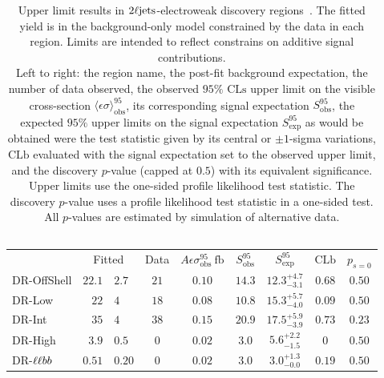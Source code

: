 \FloatBarrier
\begin{table}[tp]
\centering
\begin{tabular*}{\textwidth}{lr@{$~\pm~$}lcccccc}
& \multicolumn{2}{c}{Fitted}
& Data
& $A\epsilon\sigma_{\mathrm{obs}}^{95}~\mathrm{fb}$
& $S_{\mathrm{obs}}^{95}$
& $S_{\mathrm{exp}}^{95}$
& $\mathrm{CLb}$
& $p_{s\!=\!0}$
\\[1.5ex]
DR-OffShell & $22.1$ & $2.7$ & $21$ & $0.10$ & $14.3$ & $12.3^{+4.7}_{-3.1}$ & $0.68$ & $0.50$
\\[.5ex]
DR-Low & $22$ & $4$ & $18$ & $0.08$ & $10.8$ & $15.3^{+5.7}_{-4.0}$ & $0.09$ & $0.50$
\\[.5ex]
DR-Int & $35$ & $4$ & $38$ & $0.15$ & $20.9$ & $17.5^{+5.9}_{-3.9}$ & $0.73$ & $0.23$
\\[.5ex]
DR-High & $3.9$ & $0.5$ & $0$ & $0.02$ & $3.0$ & $5.6^{+2.2}_{-1.5}$ & $0$ & $0.50$
\\[.5ex]
DR-$\ell\ell bb$ & $0.51$ & $0.20$ & $0$ & $0.02$ & $3.0$ & $3.0^{+1.3}_{-0.0}$ & $0.19$ & $0.50$
\\[.5ex]
\end{tabular*}
\caption[
Upper limit results in $\twoljets$-electroweak discovery regions
]{%
Upper limit results in $\twoljets$-electroweak discovery
regions~\cite{atlas2022searches}.
The fitted yield is in the background-only model constrained by the data in each region.
Limits are intended to reflect constrains on additive signal contributions.
\\[0.5em]
Left to right:
the region name,
the post-fit background expectation,
the number of data observed,
the observed $95\%$ $\mathrm{CLs}$ upper limit on the visible cross-section
$\langle\epsilon\sigma\rangle_\mathrm{obs}^{95}$,
its corresponding signal expectation $S_\mathrm{obs}^{95}$,
the expected $95\%$ upper limits on the signal expectation $S_\mathrm{exp}^{95}$
as would be obtained were the test statistic given by its central or
$\pm1$-sigma variations,
$\mathrm{CLb}$ evaluated with the signal expectation set to the observed upper limit,
and the discovery $p$-value (capped at $0.5$) with its equivalent significance.
\\[0.5em]
Upper limits use the one-sided profile likelihood test statistic.
The discovery $p$-value uses a profile likelihood test statistic in a one-sided test.
All $p$-values are estimated by simulation of alternative data.
\\
\\
}
\label{tab:2ljets_discovery}
\end{table}

